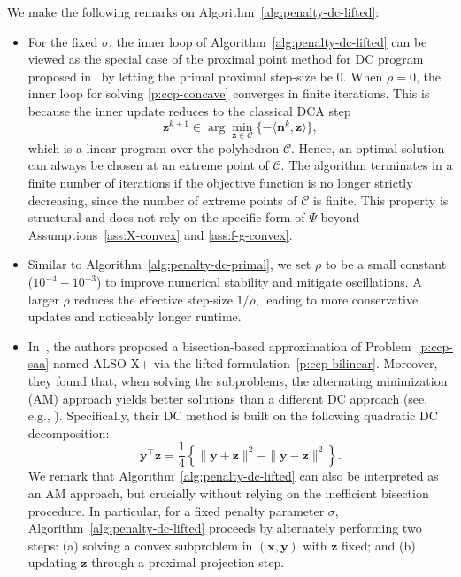 \documentclass[11pt]{article}
\def\bs{\boldsymbol}
\def\C{\mathcal{C}}
\begin{document}
We make the following remarks on Algorithm~\ref{alg:penalty-dc-lifted}:
\begin{itemize}
\item[(i)]
For the fixed $\sigma$, the inner loop of Algorithm~\ref{alg:penalty-dc-lifted} can be viewed as the special case of the proximal point method for DC program proposed in~\cite{banert2019general} by letting the primal proximal step-size be $0$.
When $\rho=0$, the inner loop for solving \eqref{p:ccp-concave} converges in finite iterations. This is because the inner update reduces to the classical DCA step
\[
\bs{z}^{k+1}\in\arg\min_{\bs{z}\in\C}\{-\langle \bs{n}^k,\bs{z}\rangle\},
\]
which is a linear program over the polyhedron $\C$. Hence, an optimal solution can always be chosen at an extreme point of $\C$. The algorithm terminates in a finite number of iterations if the objective function is no longer strictly decreasing, since the number of extreme points of $\C$ is finite. This property is structural and does not rely on the specific form of $\Psi$ beyond Assumptions~\ref{ass:X-convex} and \ref{ass:f-g-convex}.

\item[(ii)]
Similar to Algorithm~\ref{alg:penalty-dc-primal}, we set $\rho$ to be a small constant ($10^{-4} -10^{-3}$) to improve numerical stability and mitigate oscillations. A larger $\rho$ reduces the effective step-size $1/\rho$, leading to more conservative updates and noticeably longer runtime.

\item[(iii)]
In~\cite{jiang2022also}, the authors proposed a bisection-based approximation of Problem~\eqref{p:ccp-saa} named ALSO-X+ via the lifted formulation~\eqref{p:ccp-bilinear}. Moreover, they found that, when solving the subproblems, the alternating minimization (AM) approach yields better solutions than a different DC approach (see, e.g., \cite{jara2018study}). Specifically, their DC method is built on the following quadratic DC decomposition:
\[
\bs{y}^\top\bs{z} = \frac{1}{4} \left \{\|\bs{y} + \bs{z}\|^2 -  \|\bs{y} - \bs{z}\|^2 \right \}.
\]
We remark that Algorithm~\ref{alg:penalty-dc-lifted} can also be interpreted as an AM approach, but crucially without relying on the inefficient bisection procedure.
In particular, for a fixed penalty parameter $\sigma$, Algorithm~\ref{alg:penalty-dc-lifted} proceeds by alternately performing two steps: (a) solving a convex subproblem in $(\bs{x},\bs{y})$ with $\bs{z}$ fixed; and (b) updating $\bs{z}$ through a proximal projection step. 


\end{itemize}
\end{document}
